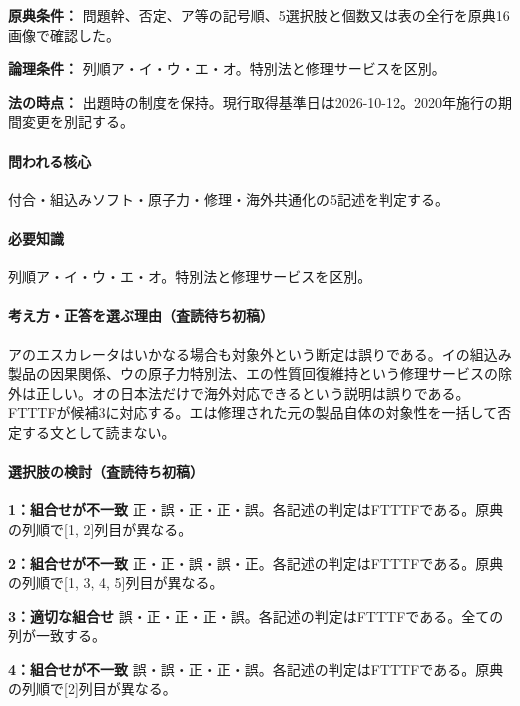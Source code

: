 \noindent\textbf{原典条件：} 問題幹、否定、ア等の記号順、5選択肢と個数又は表の全行を原典16画像で確認した。\par

\noindent\textbf{論理条件：} 列順ア・イ・ウ・エ・オ。特別法と修理サービスを区別。\par

\noindent\textbf{法の時点：} 出題時の制度を保持。現行取得基準日は2026-10-12。2020年施行の期間変更を別記する。\par

\paragraph{問われる核心} 付合・組込みソフト・原子力・修理・海外共通化の5記述を判定する。

\paragraph{必要知識} 列順ア・イ・ウ・エ・オ。特別法と修理サービスを区別。

\paragraph{考え方・正答を選ぶ理由（査読待ち初稿）} アのエスカレータはいかなる場合も対象外という断定は誤りである。イの組込み製品の因果関係、ウの原子力特別法、エの性質回復維持という修理サービスの除外は正しい。オの日本法だけで海外対応できるという説明は誤りである。FTTTFが候補3に対応する。エは修理された元の製品自体の対象性を一括して否定する文として読まない。

\paragraph{選択肢の検討（査読待ち初稿）}\mbox{}\par

\noindent\textbf{1：組合せが不一致} 正・誤・正・正・誤。各記述の判定はFTTTFである。原典の列順で[1, 2]列目が異なる。\par

\noindent\textbf{2：組合せが不一致} 正・正・誤・誤・正。各記述の判定はFTTTFである。原典の列順で[1, 3, 4, 5]列目が異なる。\par

\noindent\textbf{3：適切な組合せ} 誤・正・正・正・誤。各記述の判定はFTTTFである。全ての列が一致する。\par

\noindent\textbf{4：組合せが不一致} 誤・誤・正・正・誤。各記述の判定はFTTTFである。原典の列順で[2]列目が異なる。\par

